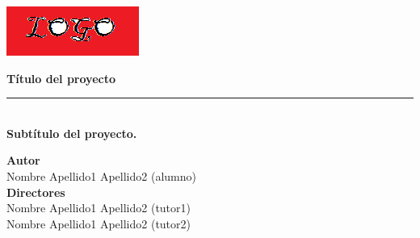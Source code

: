 \begin{titlepage}
 
 
\setlength{\centeroffset}{-0.5\oddsidemargin}
\addtolength{\centeroffset}{0.5\evensidemargin}
\thispagestyle{empty}

\noindent\hspace*{\centeroffset}\begin{minipage}{\textwidth}

\centering



 \vspace{3.3cm}

\includegraphics{imagenes/logo.png} 
 \vspace{0.5cm}


{\Huge\bfseries Título del proyecto\\
}
\noindent\rule[-1ex]{\textwidth}{3pt}\\[3.5ex]
{\large\bfseries Subtítulo del proyecto.\\[4cm]}
\end{minipage}

\vspace{2.5cm}
\noindent\hspace*{\centeroffset}\begin{minipage}{\textwidth}
\centering

\textbf{Autor}\\ {Nombre Apellido1 Apellido2 (alumno)}\\[2.5ex]
\textbf{Directores}\\
{Nombre Apellido1 Apellido2 (tutor1)\\
Nombre Apellido1 Apellido2 (tutor2)}\\[2cm]
\end{minipage}

 
\end{titlepage}


